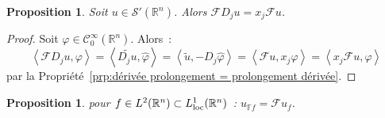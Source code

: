 \documentclass{report}
\newcommand{\R}{{\mathbb R}}
\newcommand{\scpr}[2]{\left\langle#1, #2\right\rangle}
\newcommand{\loc}{{\text{\textnormal{loc}}}}
\newtheorem{prp}[thm]{Proposition}
\theoremstyle{definition}
\theoremstyle{remark}
\begin{document}
\begin{prp} Soit $u \in \mathcal S'(\R^n)$. Alors $\mathcal FD_ju = x_j\mathcal Fu$.
\end{prp}

\begin{proof} Soit $\varphi \in \mathcal C^\infty_0(\R^n)$. Alors~:
\[\scpr {\mathcal FD_ju}\varphi = \scpr {\widetilde {D_ju}}{\widehat \varphi} = \scpr {\widetilde u}{-D_j\widehat \varphi} = \scpr {\mathcal Fu}{x_j\varphi}
= \scpr {x_j\mathcal Fu}\varphi\]
par la Propriété~\ref{prp:dérivée prolongement = prolongement dérivée}.
\end{proof}

\begin{prp} pour $f \in L^2(\R^n) \subset L^1_\loc(\R^n)$~: $u_{\mathbb Ff} = \mathcal Fu_f$.
\end{prp}
\end{document}
